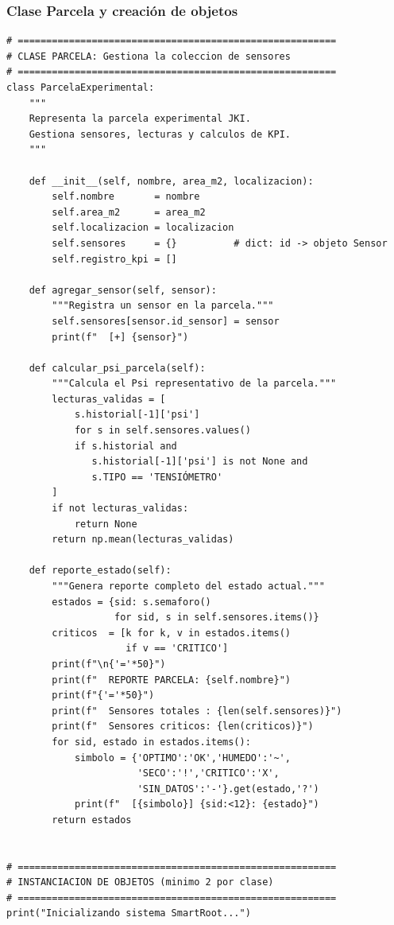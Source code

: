 \documentclass[12pt,a4paper]{article}
\begin{document}
\subsubsection{Clase Parcela y creación de objetos}

\begin{lstlisting}[caption={Clase \texttt{ParcelaExperimental} y creación de objetos del sistema.}, label=lst:poo2]
# ========================================================
# CLASE PARCELA: Gestiona la coleccion de sensores
# ========================================================
class ParcelaExperimental:
    """
    Representa la parcela experimental JKI.
    Gestiona sensores, lecturas y calculos de KPI.
    """
    
    def __init__(self, nombre, area_m2, localizacion):
        self.nombre       = nombre
        self.area_m2      = area_m2
        self.localizacion = localizacion
        self.sensores     = {}          # dict: id -> objeto Sensor
        self.registro_kpi = []
    
    def agregar_sensor(self, sensor):
        """Registra un sensor en la parcela."""
        self.sensores[sensor.id_sensor] = sensor
        print(f"  [+] {sensor}")
    
    def calcular_psi_parcela(self):
        """Calcula el Psi representativo de la parcela."""
        lecturas_validas = [
            s.historial[-1]['psi']
            for s in self.sensores.values()
            if s.historial and 
               s.historial[-1]['psi'] is not None and
               s.TIPO == 'TENSIÓMETRO'
        ]
        if not lecturas_validas:
            return None
        return np.mean(lecturas_validas)
    
    def reporte_estado(self):
        """Genera reporte completo del estado actual."""
        estados = {sid: s.semaforo() 
                   for sid, s in self.sensores.items()}
        criticos  = [k for k, v in estados.items() 
                     if v == 'CRITICO']
        print(f"\n{'='*50}")
        print(f"  REPORTE PARCELA: {self.nombre}")
        print(f"{'='*50}")
        print(f"  Sensores totales : {len(self.sensores)}")
        print(f"  Sensores criticos: {len(criticos)}")
        for sid, estado in estados.items():
            simbolo = {'OPTIMO':'OK','HUMEDO':'~',
                       'SECO':'!','CRITICO':'X',
                       'SIN_DATOS':'-'}.get(estado,'?')
            print(f"  [{simbolo}] {sid:<12}: {estado}")
        return estados


# ========================================================
# INSTANCIACION DE OBJETOS (minimo 2 por clase)
# ========================================================
print("Inicializando sistema SmartRoot...")


\end{lstlisting}
\end{document}
